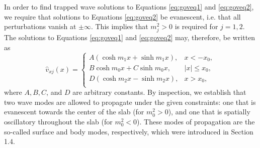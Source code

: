\documentclass[12pt]{ociamthesis}
\begin{document}
In order to find trapped wave solutions to Equations \eqref{eq:goveq1} and \eqref{eq:goveq2}, we require that solutions to Equations \eqref{eq:goveq2} be evanescent, i.e. that all perturbations vanish at $\pm \infty$.
This implies that $m_j^2 > 0$ is required for $j = 1, 2$.
The solutions to Equations \eqref{eq:goveq1} and \eqref{eq:goveq2} may, therefore, be written as
\begin{equation}
\label{eq:goveqsol}
 \hat{v}_{xj} (x) =
  \begin{cases}
    A(\cosh m_1 x + \sinh m_1 x),    & x < - x_0,\\[0.3cm]
    B \cosh m_0 x + C \sinh m_0 x,  & |x| \leq x_0,\\[0.3cm]
    D(\cosh m_2 x - \sinh m_2 x),    & x > x_0,\\
  \end{cases}
\end{equation}
where $A, B, C$, and $D$ are arbitrary constants.
By inspection, we establish that two wave modes are allowed to propagate under the given constraints: one that is evanescent towards the center of the slab (for $m_0^2 > 0$), and one that is spatially oscillatory throughout the slab (for $m_0^2 < 0$).
These modes of propagation are the so-called surface and body modes, respectively, which were introduced in Section 1.4.
\end{document}
